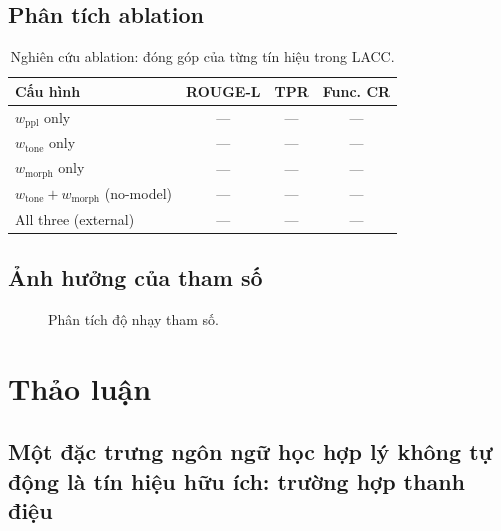 \documentclass[12pt,a4paper]{article}
\newcommand{\method}[1]{\textsc{#1}}         %
\begin{document}
\subsection{Phân tích ablation}

\begin{table}[H]
\centering
\caption{Nghiên cứu ablation: đóng góp của từng tín hiệu trong \method{LACC}.}
\label{tab:ablation}
\begin{tabular}{lccc}
\toprule
\textbf{Cấu hình} & \textbf{ROUGE-L} & \textbf{TPR} & \textbf{Func. CR} \\
\midrule
$w_{\text{ppl}}$ only & --- & --- & --- \\
$w_{\text{tone}}$ only & --- & --- & --- \\
$w_{\text{morph}}$ only & --- & --- & --- \\
$w_{\text{tone}} + w_{\text{morph}}$ (no-model) & --- & --- & --- \\
All three (external) & --- & --- & --- \\
\bottomrule
\end{tabular}
\end{table}

\subsection{Ảnh hưởng của tham số}

\begin{figure}[H]
\centering
{}
\caption{Phân tích độ nhạy tham số.}
\label{fig:sensitivity}
\end{figure}


\section{Thảo luận}

\subsection{Một đặc trưng ngôn ngữ học hợp lý không tự động là tín hiệu hữu ích: trường hợp thanh điệu}
\label{sec:why_tone_negative}
\end{document}
